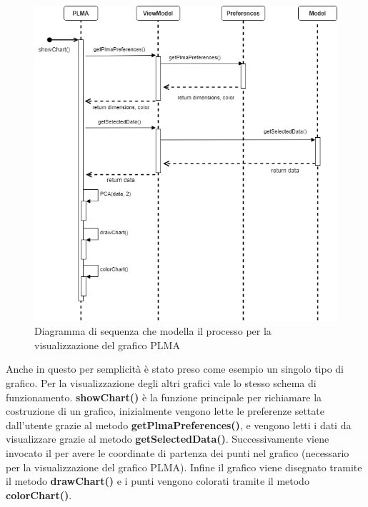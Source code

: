 \newpage
\begin{figure}[hb]
\includegraphics[width=15cm]{Images/Allegato Tecnico-Sequenza-PLMA}
\centering
\caption{Diagramma di sequenza che modella il processo per la visualizzazione del grafico PLMA}
\end{figure}
Anche in questo per semplicità è stato preso come esempio un singolo tipo di grafico. Per la visualizzazione degli altri grafici vale lo stesso schema di funzionamento.
\textbf{showChart()} è la funzione principale per richiamare la costruzione di un grafico, inizialmente vengono lette le preferenze settate dall'utente grazie al metodo \textbf{getPlmaPreferences()}, e vengono letti i dati da visualizzare grazie al metodo \textbf{getSelectedData()}. Successivamente viene invocato il  per avere le coordinate di partenza dei punti nel grafico (necessario per la visualizzazione del grafico PLMA). Infine il grafico viene disegnato tramite il metodo \textbf{drawChart()} e i punti vengono colorati tramite il metodo \textbf{colorChart()}.

\newpage